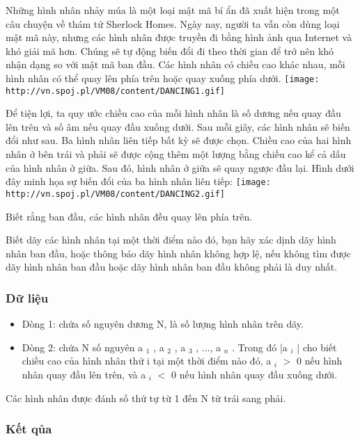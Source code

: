 



   Những hình nhân nhảy múa là một loại mật mã bí ẩn đã xuất hiện trong một câu chuyện về thám tử Sherlock Homes.  Ngày nay, người ta vẫn còn dùng loại mật mã này, nhưng các hình nhân được truyền đi bằng hình ảnh qua Internet và khó giải mã hơn. Chúng sẽ tự động biến đổi đi theo thời gian để trở nên khó nhận dạng so với mật mã ban đầu. Các hình nhân có chiều cao khác nhau, mỗi hình nhân có thể quay lên phía trên hoặc quay xuống phía dưới.  
\texttt{[image: http://vn.spoj.pl/VM08/content/DANCING1.gif]}

   Để tiện lợi, ta quy ước chiều cao của mỗi hình nhân là số dương nếu quay đầu lên trên và số âm nếu quay đầu xuống dưới.  Sau mỗi giây, các hình nhân sẽ biến đổi như sau. Ba hình nhân liên tiếp bất kỳ sẽ được chọn. Chiều cao của hai hình nhân ở bên trái và phải sẽ được cộng thêm một lượng bằng       chiều cao kể cả dấu      của hình nhân ở giữa. Sau đó, hình nhân ở giữa sẽ quay ngược đầu lại. Hình dưới đây minh họa sự biến đổi của ba hình nhân liên tiếp:  
\texttt{[image: http://vn.spoj.pl/VM08/content/DANCING2.gif]}

   Biết rằng ban đầu, các hình nhân       đều quay lên phía trên.     

   Biết dãy các hình nhân tại một thời điểm nào đó, bạn hãy xác dịnh dãy hình nhân ban đầu, hoặc thông báo dãy hình nhân không hợp lệ, nếu không tìm được dãy hình nhân ban đầu hoặc dãy hình nhân ban đầu không phải là duy nhất.  

\subsubsection{   Dữ liệu  }
\begin{itemize}
	\item     Dòng 1: chứa số nguyên dương N, là số lượng hình nhân trên dãy.   
	\item     Dòng 2: chứa N số nguyên a    $_     1    $    , a    $_     2    $    , a    $_     3    $    , ..., a    $_     n    $    . Trong đó |a    $_     i    $    | cho biết chiều cao của hình nhân thứ i tại một thời điểm nào đó, a    $_     i    $    $>$ 0 nếu hình nhân quay đầu lên trên, và a    $_     i    $    $<$ 0 nếu hình nhân quay đầu xuống dưới.   
\end{itemize}

   Các hình nhân được đánh số thứ tự từ 1 đến N từ trái sang phải.  

\subsubsection{   Kết qủa  }

